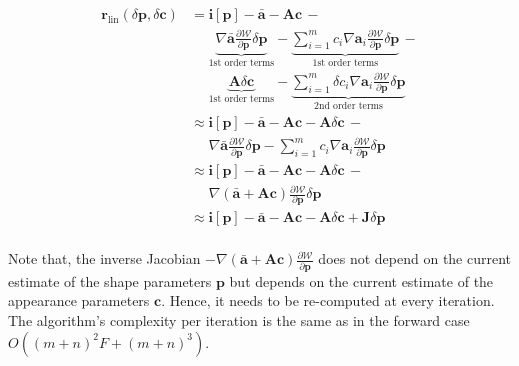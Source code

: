 \begin{equation}
    \begin{aligned}
        \mathbf{r}_\text{lin}(\delta\mathbf{p}, \delta\mathbf{c}) & = \mathbf{i}[\mathbf{p}] - \bar{\mathbf{a}} - \mathbf{A}\mathbf{c} \, - 
        \\
        & \quad \,\, \underbrace{\nabla\bar{\mathbf{a}}\frac{\partial\mathcal{W}}{\partial\mathbf{p}}\delta\mathbf{p}}_{\text{1st order terms}}  - \underbrace{\sum_{i=1}^m c_i \nabla\mathbf{a}_i \frac{\partial\mathcal{W}}{\partial\mathbf{p}} \delta\mathbf{p}}_{\text{1st order terms}} \, - 
        \\
        & \quad \,\, \underbrace{\mathbf{A}\delta\mathbf{c}}_{\text{1st order terms}} - \underbrace{\sum_{i=1}^m \delta c_i\nabla\mathbf{a}_i\frac{\partial\mathcal{W}}{\partial\mathbf{p}}\delta\mathbf{p}}_{\text{2nd order terms}} 
        \\
        & \approx \mathbf{i}[\mathbf{p}] - \bar{\mathbf{a}} - \mathbf{A}\mathbf{c} - \mathbf{A}\delta\mathbf{c} \, -
        \\
        & \quad \,\, \nabla\bar{\mathbf{a}}\frac{\partial\mathcal{W}}{\partial\mathbf{p}}\delta\mathbf{p} - \sum_{i=1}^m c_i \nabla\mathbf{a}_i \frac{\partial\mathcal{W}}{\partial\mathbf{p}} \delta\mathbf{p}
        \\
        & \approx \mathbf{i}[\mathbf{p}] - \bar{\mathbf{a}} - \mathbf{A}\mathbf{c} - \mathbf{A}\delta\mathbf{c} \, -
        \\
        & \quad \,\, \nabla\left(\bar{\mathbf{a}} + \mathbf{A}\mathbf{c} \right) \frac{\partial\mathcal{W}}{\partial\mathbf{p}} \delta\mathbf{p}
        \\
        & \approx \mathbf{i}[\mathbf{p}] - \bar{\mathbf{a}} - \mathbf{A}\mathbf{c} - \mathbf{A}\delta\mathbf{c} + \mathbf{J}\delta\mathbf{p}
        \\
    \label{eq:sim_lin_res}
    \end{aligned}
\end{equation}

Note that, the inverse Jacobian $-\nabla\left(\bar{\mathbf{a}} + \mathbf{A}\mathbf{c} \right) \frac{\partial\mathcal{W}}{\partial\mathbf{p}}$ does not depend on the current estimate of the shape parameters $\mathbf{p}$ but depends on the current estimate of the appearance parameters $\mathbf{c}$. Hence, it needs to be re-computed at every iteration. The algorithm's complexity per iteration is the same as in the forward case $O((m+n)^2F + (m + n)^3)$. 
